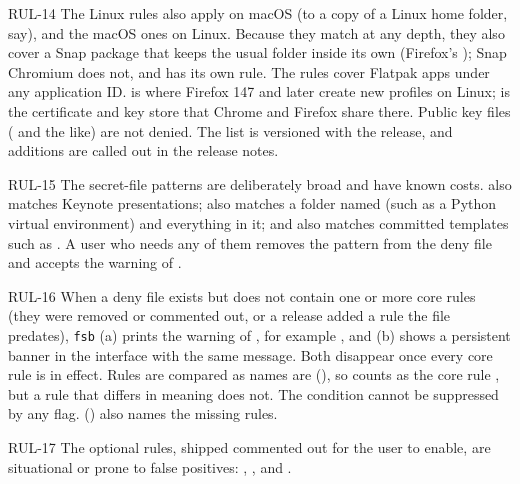 \begin{req}{RUL-14}
The Linux rules also apply on macOS (to a copy of a Linux home folder, say), and the
macOS ones on Linux.  Because they match at any depth, they also cover a Snap package
that keeps the usual folder inside its own (Firefox's ); Snap Chromium
does not, and has its own rule.  The  rules cover Flatpak apps under any
application ID.   is where Firefox 147 and later create new
profiles on Linux;  is the certificate and key store that Chrome and
Firefox share there.
Public key files ( and the like) are not denied.  The list is
versioned with the release, and additions are called out in the release notes.
\end{req}

\begin{req}{RUL-15}
The secret-file patterns are deliberately broad and have known costs.  
also matches Keynote presentations;  also matches a folder named
 (such as a Python virtual environment) and everything in it; and
 also matches committed templates such as .  A user who
needs any of them removes the pattern from the deny file and accepts the warning of
.
\end{req}

\begin{req}{RUL-16}
When a deny file exists but does not contain one or more core rules (they were removed
or commented out, or a release added a rule the file predates), \texttt{fsb}
(a) prints the warning of , for example
, and (b) shows a persistent banner in the interface with the same
message.  Both disappear once every core rule is in effect.  Rules are compared as
names are (), so  counts as the core rule , but a
rule that differs in meaning does not.  The condition cannot be suppressed by any flag.
 () also names the missing rules.
\end{req}

\begin{req}{RUL-17}
The optional rules, shipped commented out for the user to enable, are situational or
prone to false positives: , ,
 and .
\end{req}

